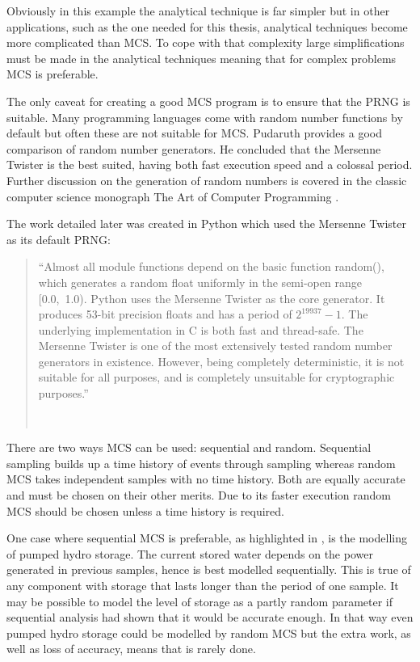 \documentclass[a4paper,oneside,12pt]{report}
\newcommand{\tmpquotecite}{}%
\newenvironment{myquote}[1][]
{\renewcommand{\tmpquotecite}{#1}\begin{quote}\begin{itshape}``}
{''\end{itshape}~{\normalfont~\tmpquotecite}\end{quote}}
\begin{document}
Obviously in this example the analytical technique is far simpler but in other applications, such as the one needed for this thesis, analytical techniques become more complicated than MCS. To cope with that complexity large simplifications must be made in the analytical techniques meaning that for complex problems MCS is preferable.

The only caveat for creating a good MCS program is to ensure that the PRNG is suitable. Many programming languages come with random number functions by default but often these are not suitable for MCS. Pudaruth \cite{Pudaruth2009} provides a good comparison of random number generators. He concluded that the Mersenne Twister is the best suited, having both fast execution speed and a colossal period. Further discussion on the generation of random numbers is covered in the classic computer science monograph The Art of Computer Programming \cite{Knuth1998}.

The work detailed later was created in Python which used the Mersenne Twister as its default PRNG:

\begin{myquote}[\cite{Python}]Almost all module functions depend on the basic function random(), which generates a random float uniformly in the semi-open range [0.0,~1.0). Python uses the Mersenne Twister as the core generator. It produces 53-bit precision floats and has a period of $2^{19937}-1$. The underlying implementation in C is both fast and thread-safe. The Mersenne Twister is one of the most extensively tested random number generators in existence. However, being completely deterministic, it is not suitable for all purposes, and is completely unsuitable for cryptographic purposes.\end{myquote}

There are two ways MCS can be used: sequential and random. Sequential sampling builds up a time history of events through sampling whereas random MCS takes independent samples with no time history. Both are equally accurate and must be chosen on their other merits. Due to its faster execution random MCS should be chosen unless a time history is required.

One case where sequential MCS is preferable, as highlighted in \cite{Billinton1996}, is the modelling of pumped hydro storage. The current stored water depends on the power generated in previous samples, hence is best modelled sequentially. This is true of any component with storage that lasts longer than the period of one sample. It may be possible to model the level of storage as a partly random parameter if sequential analysis had shown that it would be accurate enough. In that way even pumped hydro storage could be modelled by random MCS but the extra work, as well as loss of accuracy, means that is rarely done.
\end{document}
